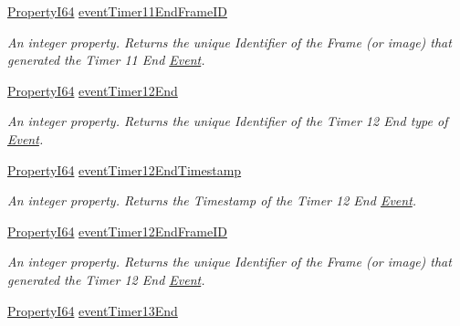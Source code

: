 \begin{DoxyCompactItemize}
\hyperlink{group___common_interface_ga81749b2696755513663492664a18a893}{Property\+I64} \hyperlink{classmv_i_m_p_a_c_t_1_1acquire_1_1_gen_i_cam_1_1_event_control_a79d91e8df0299e9a14b74c321dffd607}{event\+Timer11\+End\+Frame\+I\+D}
\begin{DoxyCompactList}\small\item\em An integer property. Returns the unique Identifier of the Frame (or image) that generated the Timer 11 End \hyperlink{classmv_i_m_p_a_c_t_1_1acquire_1_1_event}{Event}. \end{DoxyCompactList}\item 
\hyperlink{group___common_interface_ga81749b2696755513663492664a18a893}{Property\+I64} \hyperlink{classmv_i_m_p_a_c_t_1_1acquire_1_1_gen_i_cam_1_1_event_control_a916b3eef2efa19420850a9960d78224a}{event\+Timer12\+End}
\begin{DoxyCompactList}\small\item\em An integer property. Returns the unique Identifier of the Timer 12 End type of \hyperlink{classmv_i_m_p_a_c_t_1_1acquire_1_1_event}{Event}. \end{DoxyCompactList}\item 
\hyperlink{group___common_interface_ga81749b2696755513663492664a18a893}{Property\+I64} \hyperlink{classmv_i_m_p_a_c_t_1_1acquire_1_1_gen_i_cam_1_1_event_control_a23d485af97786fcf1bac6fbb3b82b9e9}{event\+Timer12\+End\+Timestamp}
\begin{DoxyCompactList}\small\item\em An integer property. Returns the Timestamp of the Timer 12 End \hyperlink{classmv_i_m_p_a_c_t_1_1acquire_1_1_event}{Event}. \end{DoxyCompactList}\item 
\hyperlink{group___common_interface_ga81749b2696755513663492664a18a893}{Property\+I64} \hyperlink{classmv_i_m_p_a_c_t_1_1acquire_1_1_gen_i_cam_1_1_event_control_a69d78e5cbc0c5d9ba31f5a952032000f}{event\+Timer12\+End\+Frame\+I\+D}
\begin{DoxyCompactList}\small\item\em An integer property. Returns the unique Identifier of the Frame (or image) that generated the Timer 12 End \hyperlink{classmv_i_m_p_a_c_t_1_1acquire_1_1_event}{Event}. \end{DoxyCompactList}\item 
\hyperlink{group___common_interface_ga81749b2696755513663492664a18a893}{Property\+I64} \hyperlink{classmv_i_m_p_a_c_t_1_1acquire_1_1_gen_i_cam_1_1_event_control_a26c759bbe5d97ef5198738153d6786a7}{event\+Timer13\+End}

\end{DoxyCompactItemize}
